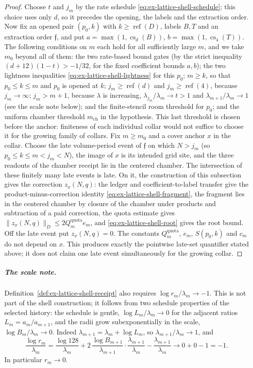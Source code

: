 \begin{proof}
Choose $t$ and $j_m$ by the rate schedule
\eqref{eq:ex-lattice-shell-schedule}; this choice uses only $d$, so it
precedes the opening, the labels and the extraction order.  Now fix an
opened pair $(p_0,k)$ with $k\ge\operatorname{ref}(D)$, labels $B,T$ and
an extraction order $\mathfrak f$, and put
$a=\max(1,\operatorname{cs}_d(B))$, $b=\max(1,\operatorname{cs}_4(T))$.
The following conditions on $m$ each hold for all sufficiently large $m$,
and we take $m_0$ beyond all of them: the two rate-based bound gates (by
the strict inequality $(d+12)(1-t)>-1/32$, for the fixed coefficient bounds
$a,b$); the two lightness inequalities
\eqref{eq:ex-lattice-shell-lightness} for this $p_0$; $m\ge k$, so that
$p_0\le k\le m$ and $p_0$ is opened at $k$; $j_m\ge\operatorname{ref}(d)$
and $j_m\ge\operatorname{ref}(4)$, because $j_m\to\infty$; $j_m>m+1$,
because $\lambda$ is increasing, $\lambda_{j_m}/\lambda_m\to t>1$ and
$\lambda_{m+1}/\lambda_m\to1$ (see the scale note below); and
the finite-stencil room threshold for $p_0$; and the uniform chamber
threshold $m_{\mathrm{ch}}$ in the hypothesis. This last threshold is
chosen before the anchor: finiteness of each individual collar would not
suffice to choose it for the growing family of collars. Fix $m\ge m_0$ and a cover
anchor $x$ in the collar.  Choose the late volume-period event of
$\mathfrak f$ on which $N>j_m$ (so $p_0\le k\le m<j_m<N$), the image of $x$
is its intended grid site, and the three readouts of the chamber receipt
lie in the centered chamber.  The intersection of these finitely many late
events is late.  On it, the construction of this subsection gives the
correction $z_x(N,q)$: the ledger and coefficient-to-label transfer give
the product-minus-correction identity \eqref{eq:ex-lattice-shell-fragment},
the fragment lies in the centered chamber by closure of the chamber under
products and subtraction of a paid correction, the quota estimate gives
$\|z_x(N,q)\|_D\le2Q_m^{\mathrm{quota}}e_m$, and \eqref{eq:ex-lattice-shell-root}
gives the root bound.  Off the late event put $z_x(N,q)=0$.  The constants
$Q_m^{\mathrm{quota}}$, $e_m$, $S(p_0,k)$ and $c_m$ do not depend on $x$.
This produces exactly the pointwise late-set quantifier stated above; it
does not claim one late event simultaneously for the growing collar.
\end{proof}

\subparagraph{The scale note.}
Definition~\ref{def:ex-lattice-shell-receipt} also requires
$\log r_m/\lambda_m\to-1$.  This is not part of the shell construction; it
follows from two schedule properties of the selected history: the schedule
is gentle, $\log L_m/\lambda_m\to0$ for the adjacent ratios
$L_m=a_m/a_{m+1}$, and the radii grow subexponentially in the scale,
$\log B_m/\lambda_m\to0$.  Indeed $\lambda_{m+1}=\lambda_m+\log L_m$, so
$\lambda_{m+1}/\lambda_m\to1$, and
\[
 \frac{\log r_m}{\lambda_m}
 =\frac{\log128}{\lambda_m}
  +2\,\frac{\log B_{m+1}}{\lambda_{m+1}}\cdot\frac{\lambda_{m+1}}{\lambda_m}
  -\frac{\lambda_{m+1}}{\lambda_m}
 \longrightarrow0+0-1=-1.
\]
In particular $r_m\to0$.

